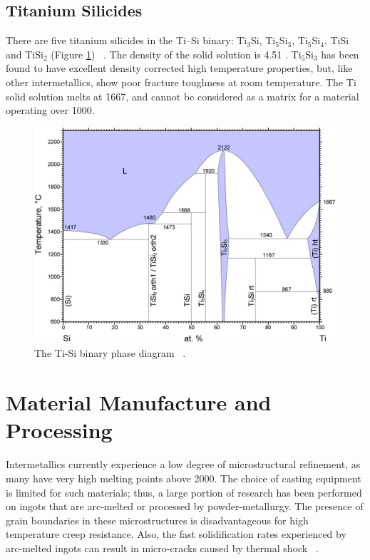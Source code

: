 \subsection{Titanium Silicides}
There are five titanium silicides in the Ti--Si binary: Ti$_3$Si, Ti$_5$Si$_3$, Ti$_5$Si$_4$, TiSi and TiSi$_2$ (Figure \ref{fig:TiSi}) ~\cite{seifert96ti}. The density of the solid solution is 4.51 \gram\usk\centi\rpcubic\meter. Ti$_5$Si$_3$ has been found to have excellent density corrected high temperature properties, but, like other intermetallics, show poor fracture toughness at room temperature. The Ti solid solution melts at 1667\celsius, and cannot be considered as a matrix for a material operating over 1000\celsius.
%
\begin{figure}[H]
\begin{center}
\includegraphics[width=\textwidth]{TiSi}
\caption{The Ti-Si binary phase diagram ~\cite{seifert96ti}.}\label{fig:TiSi}
\end{center}
\end{figure}
%


\section{Material Manufacture and Processing}

Intermetallics currently experience a low degree of microstructural refinement, as many have very high melting points above 2000\celsius.  The choice of casting equipment is limited for such materials; thus, a large portion of research has been performed on ingots that are arc-melted or processed by powder-metallurgy.  The presence of grain boundaries in these microstructures is disadvantageous for high temperature creep resistance. Also, the fast solidification rates experienced by arc-melted ingots can result in micro-cracks caused by thermal shock ~\cite{raj95a}.

